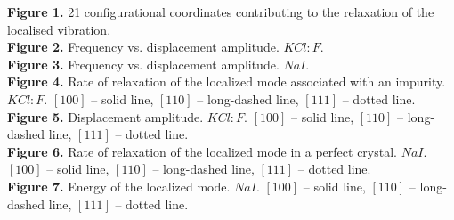 \noindent
{\bf Figure 1.} 21 configurational coordinates contributing to the
relaxation of the localised vibration. \\
{\bf Figure 2.} Frequency vs. displacement amplitude. $KCl:F$.\\
{\bf Figure 3.} Frequency vs. displacement amplitude. 
$NaI$.\\
{\bf Figure 4.} Rate of relaxation of the localized mode associated with
an impurity. $KCl:F$. $[100]$ -- solid line, $[110]$ -- long-dashed line,
$[111]$ -- dotted line.\\
{\bf Figure 5.} Displacement amplitude. 
$KCl:F$. $[100]$ -- solid line, $[110]$ -- long-dashed line,
$[111]$ -- dotted line.\\
{\bf Figure 6.} Rate of relaxation of the localized mode in a perfect
crystal. $NaI$. $[100]$ -- solid line, $[110]$ -- long-dashed line,
$[111]$ -- dotted line.\\
{\bf Figure 7.} Energy of the localized mode. 
$NaI$. $[100]$ -- solid line, $[110]$ -- long-dashed line,
$[111]$ -- dotted line.\\







